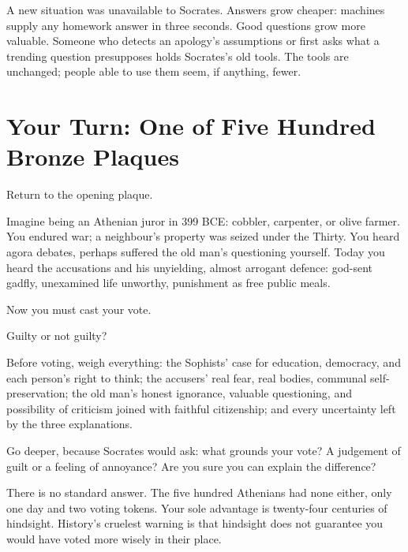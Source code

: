 A new situation was unavailable to Socrates. Answers grow cheaper: machines supply any homework answer in three seconds. Good questions grow more valuable. Someone who detects an apology's assumptions or first asks what a trending question presupposes holds Socrates's old tools. The tools are unchanged; people able to use them seem, if anything, fewer.

\section[Your Turn: One of Five Hundred Plaques]{Your Turn: One of Five Hundred Bronze Plaques}
Return to the opening plaque.

Imagine being an Athenian juror in 399 BCE: cobbler, carpenter, or olive farmer. You endured war; a neighbour's property was seized under the Thirty. You heard agora debates, perhaps suffered the old man's questioning yourself. Today you heard the accusations and his unyielding, almost arrogant defence: god-sent gadfly, unexamined life unworthy, punishment as free public meals.

Now you must cast your vote.

Guilty or not guilty?

Before voting, weigh everything: the Sophists' case for education, democracy, and each person's right to think; the accusers' real fear, real bodies, communal self-preservation; the old man's honest ignorance, valuable questioning, and possibility of criticism joined with faithful citizenship; and every uncertainty left by the three explanations.

Go deeper, because Socrates would ask: what grounds your vote? A judgement of guilt or a feeling of annoyance? Are you sure you can explain the difference?

There is no standard answer. The five hundred Athenians had none either, only one day and two voting tokens. Your sole advantage is twenty-four centuries of hindsight. History's cruelest warning is that hindsight does not guarantee you would have voted more wisely in their place.
